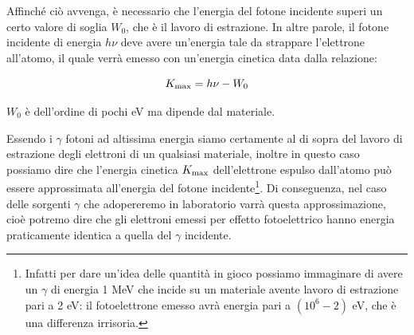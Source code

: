 \begin{figure}[H]
    \centering
\end{figure}

Affinché ciò avvenga, è necessario che l'energia del fotone incidente superi un certo valore di soglia $W_0$, che è il lavoro di estrazione. In altre parole, il fotone incidente di energia $h\nu$ deve avere un'energia tale da strappare l'elettrone all'atomo, il quale verrà emesso con un'energia cinetica data dalla relazione:

\begin{equation*}
    K_{\rm max}=h\nu - W_0
\end{equation*}

$W_0$ è dell'ordine di pochi eV ma dipende dal materiale.

Essendo i $\gamma$ fotoni ad altissima energia siamo certamente al di sopra del lavoro di estrazione degli elettroni di un qualsiasi materiale, inoltre in questo caso possiamo dire che l'energia cinetica $K_{\rm max}$ dell'elettrone espulso dall'atomo può essere approssimata all'energia del fotone incidente\footnote{Infatti per dare un'idea delle quantità in gioco possiamo immaginare di avere un $\gamma$ di energia 1 MeV che incide su un materiale avente lavoro di estrazione pari a 2 eV: il fotoelettrone emesso avrà energia pari a $(10^6 - 2)$ eV, che è una differenza irrisoria.}. Di conseguenza, nel caso delle sorgenti $\gamma$ che adopereremo in laboratorio varrà questa approssimazione, cioè potremo dire che gli elettroni emessi per effetto fotoelettrico hanno energia praticamente identica a quella del $\gamma$ incidente.

